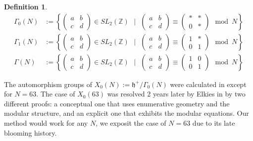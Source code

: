 \documentclass[12pt,reqno]{amsart}
\newcommand{\Z}{\mathbb{Z}}
\theoremstyle{definition}
\newtheorem{defn}{Definition}
\theoremstyle{remark}
\begin{document}
\begin{defn} 
\begin{align*} 
\Gamma_0(N) &:= \left\{ \begin{pmatrix} a & b \\ c & d \end{pmatrix} \in SL_2(\Z) \text{ }  \Big| \text{ } \begin{pmatrix} a & b \\ c & d \end{pmatrix} \equiv  \begin{pmatrix} * & * \\ 0 & * \end{pmatrix} \mod N \right\} \\
\Gamma_1(N) &:= \left\{ \begin{pmatrix} a & b \\ c & d \end{pmatrix} \in SL_2(\Z) \text{ }  \Big| \text{ }  \begin{pmatrix} a & b \\ c & d \end{pmatrix} \equiv  \begin{pmatrix} 1 & * \\ 0 & 1 \end{pmatrix} \mod N \right\} \\
\Gamma(N) &:= \left\{ \begin{pmatrix} a & b \\ c & d \end{pmatrix} \in SL_2(\Z) \text{ }  \Big| \text{ }  \begin{pmatrix} a & b \\ c & d \end{pmatrix} \equiv  \begin{pmatrix} 1 & 0 \\ 0 & 1 \end{pmatrix} \mod N \right\}
\end{align*}
 \end{defn} 

The automorphism groups of $X_0(N) := \mathfrak{h}^{+} / \Gamma_0(N)$ were calculated in \cite{km} except for $N=63$. The case of $X_0(63)$ was resolved 2 years later by Elkies in \cite{elkies} by two different proofs: a conceptual one that uses enumerative geometry and the modular structure, and an explicit one that exhibits the modular equations. Our method would work for any $N$, we exposit the case of $N=63$ due to its late blooming history.
\end{document}
